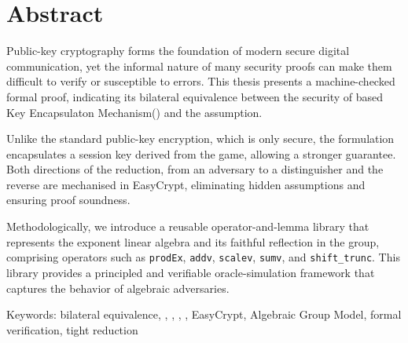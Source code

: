 \chapter*{Abstract}
Public-key cryptography forms the foundation of modern secure digital communication, yet the informal nature of many security proofs can make them difficult to verify or susceptible to errors. This thesis presents a machine-checked formal proof, indicating its bilateral equivalence between the \INDCCAone security of \ElGamal based Key Encapsulaton Mechanism(\KEM) and the \qDDH assumption.





Unlike the standard \ElGamal public-key encryption, which is only \INDCCAcpa secure, the \KEM formulation encapsulates a session key derived from the \ElGamal game, allowing a stronger \INDCCAone guarantee. Both directions of the reduction, from an \INDCCAone adversary to a \qDDH distinguisher and the reverse are mechanised in EasyCrypt, eliminating hidden assumptions and ensuring proof soundness.






 


Methodologically, we introduce a reusable operator-and-lemma library that represents the exponent linear algebra and its faithful reflection in the group, comprising operators such as \texttt{prodEx}, \texttt{addv}, \texttt{scalev}, \texttt{sumv}, and \texttt{shift\_trunc}. This library provides a principled and verifiable oracle-simulation framework that captures the behavior of algebraic adversaries.

Keywords: bilateral equivalence, \qDDH, \INDCCAone, \ElGamal, \KEM, EasyCrypt, Algebraic Group Model, formal verification, tight reduction
